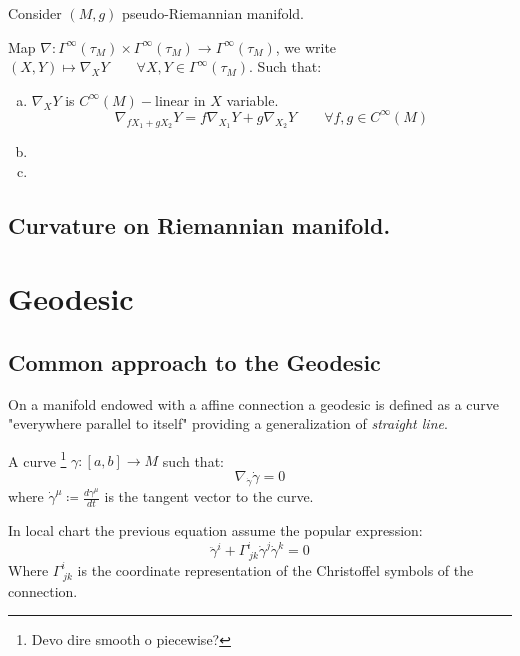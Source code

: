 \documentclass[a4paper,12pt]{scrartcl}    %
\begin{document}
Consider $(M,g)$ pseudo-Riemannian manifold.

\begin{definition}
 Map $\nabla : \Gamma^\infty(\tau_M) \times \Gamma^\infty(\tau_M) \rightarrow \Gamma^\infty(\tau_M)$,
 we write $(X,Y)\mapsto \nabla_X Y \qquad \forall X,Y \in \Gamma^\infty(\tau_M)$.
 Such that:
 \begin{enumerate}[(a)]
  \item $\nabla_X Y $ is $C^\infty(M)-$linear in $X$ variable.
   \begin{displaymath}
   \nabla_{f X_1 + g X_2}Y = f\nabla_{X_1} Y + g \nabla_{X_2} Y \qquad \forall f,g \in C^\infty(M)
   \end{displaymath}
 
  \item
  
  \item
 
 \end{enumerate}


\end{definition}

\subsection{Curvature on Riemannian manifold.}
\newpage
\section{Geodesic}
\subsection{Common approach to the Geodesic}
	On a manifold endowed with a affine connection a geodesic is defined as a curve "everywhere parallel to itself" providing a generalization of \emph{straight line}.
	\begin{definition}[Geodesic]
		A curve \danger\footnote{Devo dire smooth o piecewise? }
		$\gamma:[a,b]\rightarrow M$ such that:
		\begin{equation}
			\nabla_{\dot{\gamma}}\dot{\gamma} =0
		\end{equation}
		where $\dot{\gamma}^\mu \coloneqq \frac{d \gamma^\mu}{d t}$ is the tangent vector to the curve.
	\end{definition}
	\begin{notationfix}
		In local chart the previous equation assume the popular expression:
		\begin{equation}\label{GeodesicEquation}
			\ddot{\gamma}^i + \Gamma^i_{\, j k} \dot{\gamma}^j \dot{\gamma}^k = 0
		\end{equation}
		Where $ \Gamma^i_{\, j k}$ is the coordinate representation of the Christoffel symbols of the connection.
	\end{notationfix}
	\hspace{5mm}
\end{document}

